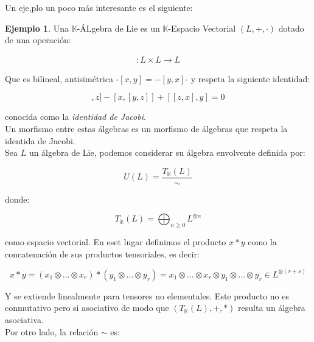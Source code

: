 \documentclass{article}
\theoremstyle{plain}
\theoremstyle{definition}
\newtheorem{ejemplo}[theorem]{Ejemplo}
\theoremstyle{remark}
\begin{document}
Un eje,plo un poco más interesante es el siguiente:

\begin{ejemplo}
    Una $\mathbb{K}$-ÁLgebra de Lie es un $\mathbb{K}$-Espacio Vectorial $(L,+,\cdot)$ dotado de una operación:

    \begin{align*}
        [-,-]:L \times L \longrightarrow L
    \end{align*}

    Que es bilineal, antisimétrica -$[x,y] = -[y,x]$- y respeta la siguiente identidad:

    \begin{equation*}
        [[x,y],z] - [x,[y,z]] + [[z,x],y] = 0
    \end{equation*}

    conocida como la \textit{identidad de Jacobi}. \\

    Un morfismo entre estas álgebras es un morfismo de álgebras que respeta la identida de Jacobi. \\

    Sea $L$ un álgebra de Lie, podemos considerar su álgebra envolvente definida por:

    \begin{equation*}
        U(L) = \frac{T_{\mathbb{K}}(L)}{\sim}
    \end{equation*}

    donde:

    \begin{equation*}
        T_{\mathbb{K}}(L) = \bigoplus_{n \geq 0} L^{\otimes n}
    \end{equation*}

    como espacio vectorial. En eset lugar definimos el producto $x * y$ como la concatenación de sus productos tensoriales, es decir:

    \begin{equation*}
        x * y = (x_1 \otimes \dots \otimes x_r) * (y_1 \otimes \dots \otimes y_r) = x_1 \otimes \dots \otimes x_r \otimes y_1 \otimes \dots \otimes y_r \in L^{\otimes (r+s)}
    \end{equation*}

    Y se extiende linealmente para tensores no elementales. Este producto no es conmutativo pero si asociativo de modo que $(T_{\mathbb{K}}(L), +, *)$ resulta un álgebra asociativa. \\

    Por otro lado, la relación $\sim$ es:
    

\end{ejemplo}
\end{document}
